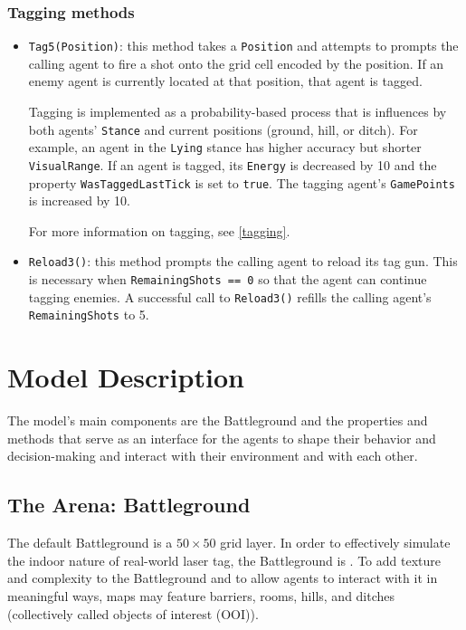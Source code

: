 \documentclass[
    a4paper,
    english,
    DIV=16,
    11pt,
    parskip=half,
    listof=totoc,		%
    index=totoc,		%
    bibliography=totoc,	%
]{scrartcl}
\begin{document}
\subsubsection{Tagging methods}
\begin{itemize}
    \item \texttt{Tag5(Position)}: this method takes a \texttt{Position} and attempts to prompts the calling agent to fire a shot onto the grid cell encoded by the position. If an enemy agent is currently located at that position, that agent is tagged.
    \par
    Tagging is implemented as a probability-based process that is influences by both agents' \texttt{Stance} and current positions (ground, hill, or ditch). For example, an agent in the \texttt{Lying} stance has higher accuracy but shorter \texttt{VisualRange}. If an agent is tagged, its \texttt{Energy} is decreased by 10 and the property \texttt{WasTaggedLastTick} is set to \texttt{true}. The tagging agent's \texttt{GamePoints} is increased by 10.
    \par
    For more information on tagging, see \ref{tagging}.
    \item \texttt{Reload3()}: this method prompts the calling agent to reload its tag gun. This is necessary when \texttt{RemainingShots == 0} so that the agent can continue tagging enemies. A successful call to \texttt{Reload3()} refills the calling agent's \texttt{RemainingShots} to 5.
\end{itemize}


\section{Model Description} \label{modelDesc}
The model's main components are the Battleground and the properties and methods that serve as an interface for the agents to shape their behavior and decision-making and interact with their environment and with each other.

\subsection{The Arena: Battleground} \label{battleground}
The default Battleground is a $50\times 50$ grid layer. In order to effectively simulate the indoor nature of real-world laser tag, the Battleground is . To add texture and complexity to the Battleground and to allow agents to interact with it in meaningful ways, maps may feature barriers, rooms, hills, and ditches (collectively called objects of interest (OOI)).
\end{document}
